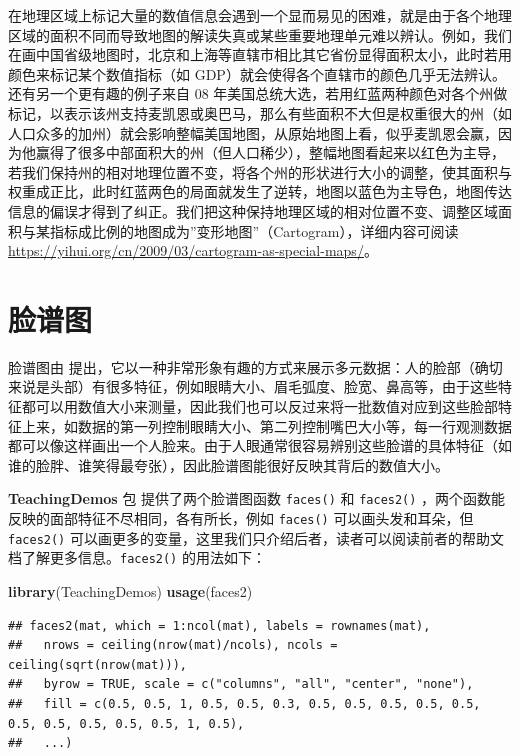 \documentclass[
  b5paper,
  UTF8,twoside]{book}
\newenvironment{Shaded}{\begin{snugshade}}{\end{snugshade}}
\newcommand{\FunctionTok}[1]{\textcolor[rgb]{0.13,0.29,0.53}{\textbf{#1}}}
\newcommand{\NormalTok}[1]{#1}
\begin{document}
在地理区域上标记大量的数值信息会遇到一个显而易见的困难，就是由于各个地理区域的面积不同而导致地图的解读失真或某些重要地理单元难以辨认。例如，我们在画中国省级地图时，北京和上海等直辖市相比其它省份显得面积太小，此时若用颜色来标记某个数值指标（如 GDP）就会使得各个直辖市的颜色几乎无法辨认。还有另一个更有趣的例子来自 08 年美国总统大选，若用红蓝两种颜色对各个州做标记，以表示该州支持麦凯恩或奥巴马，那么有些面积不大但是权重很大的州（如人口众多的加州）就会影响整幅美国地图，从原始地图上看，似乎麦凯恩会赢，因为他赢得了很多中部面积大的州（但人口稀少），整幅地图看起来以红色为主导，若我们保持州的相对地理位置不变，将各个州的形状进行大小的调整，使其面积与权重成正比，此时红蓝两色的局面就发生了逆转，地图以蓝色为主导色，地图传达信息的偏误才得到了纠正。我们把这种保持地理区域的相对位置不变、调整区域面积与某指标成比例的地图成为''变形地图''（Cartogram），详细内容可阅读 \url{https://yihui.org/cn/2009/03/cartogram-as-special-maps/}。

\section{脸谱图}\label{sec:faces}

脸谱图由 \citet{Chernoff73} 提出，它以一种非常形象有趣的方式来展示多元数据：人的脸部（确切来说是头部）有很多特征，例如眼睛大小、眉毛弧度、脸宽、鼻高等，由于这些特征都可以用数值大小来测量，因此我们也可以反过来将一批数值对应到这些脸部特征上来，如数据的第一列控制眼睛大小、第二列控制嘴巴大小等，每一行观测数据都可以像这样画出一个人脸来。由于人眼通常很容易辨别这些脸谱的具体特征（如谁的脸胖、谁笑得最夸张），因此脸谱图能很好反映其背后的数值大小。

\textbf{TeachingDemos} 包 \citep{TeachingDemos} 提供了两个脸谱图函数 \texttt{faces()} 和 \texttt{faces2()} ，两个函数能反映的面部特征不尽相同，各有所长，例如 \texttt{faces()} 可以画头发和耳朵，但 \texttt{faces2()} 可以画更多的变量，这里我们只介绍后者，读者可以阅读前者的帮助文档了解更多信息。\texttt{faces2()} 的用法如下：

\begin{Shaded}
\begin{Highlighting}[]
\FunctionTok{library}\NormalTok{(TeachingDemos)}
\FunctionTok{usage}\NormalTok{(faces2)}
\end{Highlighting}
\end{Shaded}

\begin{verbatim}
## faces2(mat, which = 1:ncol(mat), labels = rownames(mat),
##   nrows = ceiling(nrow(mat)/ncols), ncols = ceiling(sqrt(nrow(mat))),
##   byrow = TRUE, scale = c("columns", "all", "center", "none"),
##   fill = c(0.5, 0.5, 1, 0.5, 0.5, 0.3, 0.5, 0.5, 0.5, 0.5, 0.5, 0.5, 0.5, 0.5, 0.5, 0.5, 1, 0.5),
##   ...)
\end{verbatim}
\end{document}
